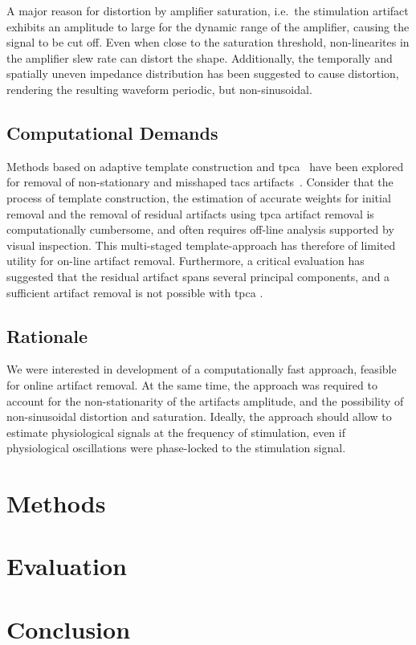 \documentclass[a4paper]{article}
\begin{document}
A major reason for distortion by amplifier saturation, i.e.\ the stimulation artifact exhibits an amplitude to large for the dynamic range of the amplifier, causing the signal to be cut off. Even when close to the saturation threshold, non-linearites in the amplifier slew rate can distort the shape. Additionally, the temporally and spatially uneven impedance distribution has been suggested to cause distortion, rendering the resulting waveform periodic, but non-sinusoidal.

\subsection{Computational Demands}

Methods based on adaptive template construction and \gls{tpca}~\citep{Niazy_2005} have been explored for removal of  non-stationary and misshaped \gls{tacs} artifacts~\citep{Helfrich_2014}.  Consider that the process of template construction, the estimation of accurate weights for initial removal and the removal of residual artifacts using  \gls{tpca}  artifact removal is computationally cumbersome, and often requires off-line analysis supported by visual inspection.
This multi-staged template-approach has therefore of limited utility for on-line artifact removal. Furthermore, a critical evaluation has suggested that the residual artifact spans several principal components, and a sufficient artifact removal is not possible with \gls{tpca} \citep{Noury_2016}.

\subsection{Rationale}

We were interested in development of a computationally fast approach, feasible for online artifact removal. At the same time, the approach was required to account for the non-stationarity of the artifacts amplitude, and the possibility of non-sinusoidal distortion and saturation. Ideally, the approach should allow to estimate physiological signals at the frequency of stimulation, even if physiological oscillations were phase-locked to the stimulation signal.

\section{Methods}

\section{Evaluation}

\section{Conclusion}




\end{document}
